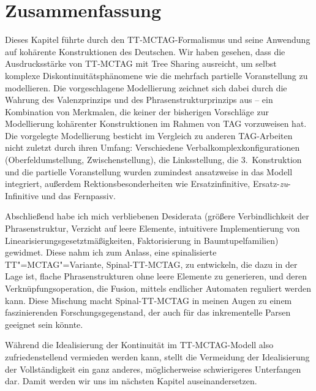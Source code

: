\section{Zusammenfassung}

Dieses Kapitel führte durch den TT-MCTAG-Formalismus und seine Anwendung auf kohärente Konstruktionen des Deutschen. Wir haben gesehen, dass die Ausdrucksstärke von TT-MCTAG mit Tree Sharing ausreicht, um selbst  komplexe Diskontinuitätsphänomene wie die mehrfach partielle Voranstellung zu modellieren. Die vorgeschlagene Modellierung zeichnet sich dabei durch die Wahrung des Valenzprinzips und des Phrasenstrukturprinzips aus -- ein Kombination von Merkmalen, die keiner der bisherigen Vorschläge zur Modellierung kohärenter Konstruktionen im Rahmen von TAG vorzuweisen hat. Die vorgelegte Modellierung besticht im Vergleich zu anderen TAG-Arbeiten nicht zuletzt durch ihren Umfang: Verschiedene  Verbalkomplexkonfigurationen (Oberfeldumstellung, Zwischenstellung), die Linksstellung, die 3.~Konstruktion und die partielle Voranstellung wurden zumindest ansatzweise in das Modell integriert, au\ss erdem Rektionsbesonderheiten wie Ersatzinfinitive, Ersatz-\emph{zu}-Infinitive und das Fernpassiv.  

Abschlie\ss end habe ich mich verbliebenen Desiderata (grö\ss ere Verbindlichkeit der Phrasenstruktur, Verzicht auf leere Elemente, intuitivere Implementierung von Linearisierungsgesetztmä\ss igkeiten, Faktorisierung in Baumtupelfamilien) gewidmet. Diese nahm ich zum Anlass, eine spinalisierte TT"=MCTAG"=Variante, Spinal-TT-MCTAG, zu entwickeln, die dazu in der Lage ist, flache Phrasenstrukturen ohne leere Elemente zu generieren, und deren Verknüpfungsoperation, die Fusion, mittels endlicher Automaten reguliert werden kann. Diese Mischung macht Spinal-TT-MCTAG in meinen Augen zu einem faszinierenden Forschungsgegenstand, der auch für das inkrementelle Parsen geeignet sein könnte.

Während die Idealisierung der Kontinuität im TT-MCTAG-Modell also zufriedenstellend vermieden werden kann, stellt die Vermeidung der Idealisierung der Vollständigkeit ein ganz anderes, möglicherweise schwierigeres Unterfangen dar. Damit werden wir uns im nächsten Kapitel auseinandersetzen.         





